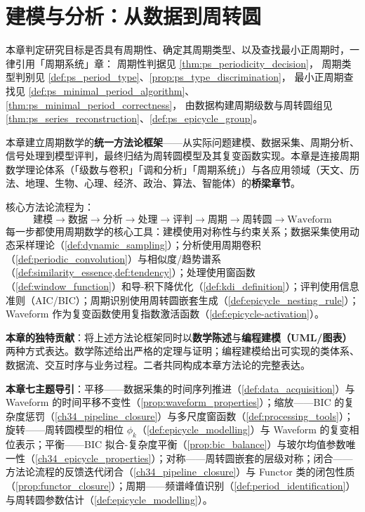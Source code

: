 \chapter{建模与分析：从数据到周转圆}
\label{chap:modelling-analysis}

\begin{remark}[本章目标的周期性判定（引用）]\label{rem:modelling_ps_hook}
本章判定研究目标是否具有周期性、确定其周期类型、以及查找最小正周期时，一律引用「周期系统」章：
周期性判据见 \cref{thm:ps_periodicity_decision}，
周期类型判别见 \cref{def:ps_period_type}、\cref{prop:ps_type_discrimination}，
最小正周期查找见 \cref{def:ps_minimal_period_algorithm}、\cref{thm:ps_minimal_period_correctness}，
由数据构建周期级数与周转圆组见 \cref{thm:ps_series_reconstruction}、\cref{def:ps_epicycle_group}。
\end{remark}

\begin{remark}\label{rem:modelling_analysis_positioning}
本章建立周期数学的\textbf{统一方法论框架}——从实际问题建模、数据采集、周期分析、信号处理到模型评判，最终归结为周转圆模型及其复变函数实现。本章是连接周期数学理论体系（「级数与卷积」「调和分析」「周期系统」）与各应用领域（天文、历法、地理、生物、心理、经济、政治、算法、智能体）的\textbf{桥梁章节}。

核心方法论流程为：
\[
\boxed{\text{建模}} \to \boxed{\text{数据}} \to \boxed{\text{分析}} \to \boxed{\text{处理}} \to \boxed{\text{评判}} \to \boxed{\text{周期}} \to \boxed{\text{周转圆}} \to \boxed{\text{Waveform}}
\]
每一步都使用周期数学的核心工具：建模使用对称性与约束关系；数据采集使用动态采样理论（\cref{def:dynamic_sampling}）；分析使用周期卷积（\cref{def:periodic_convolution}）与相似度/趋势谱系（\cref{def:similarity_essence,def:tendency}）；处理使用窗函数（\cref{def:window_function}）和导-积下降优化（\cref{def:kdi_definition}）；评判使用信息准则（AIC/BIC）；周期识别使用周转圆嵌套生成（\cref{def:epicycle_nesting_rule}）；Waveform 作为复变函数使用复指数激活函数（\cref{def:epicycle-activation}）。

\textbf{本章的独特贡献}：将上述方法论框架同时以\textbf{数学陈述}与\textbf{编程建模（UML/图表）}两种方式表达。数学陈述给出严格的定理与证明；编程建模给出可实现的类体系、数据流、交互时序与业务过程。二者共同构成本章方法论的完整表达。

\textbf{本章七主题导引}：平移——数据采集的时间序列推进（\cref{def:data_acquisition}）与 Waveform 的时间平移不变性（\cref{prop:waveform_properties}）；缩放——BIC 的复杂度惩罚（\cref{ch34_pipeline_closure}）与多尺度窗函数（\cref{def:processing_tools}）；旋转——周转圆模型的相位 $\phi_k$（\cref{def:epicycle_modelling}）与 Waveform 的复变相位表示；平衡——BIC 拟合-复杂度平衡（\cref{prop:bic_balance}）与玻尔均值参数唯一性（\cref{ch34_epicycle_properties}）；对称——周转圆嵌套的层级对称；闭合——方法论流程的反馈迭代闭合（\cref{ch34_pipeline_closure}）与 Functor 类的闭包性质（\cref{prop:functor_closure}）；周期——频谱峰值识别（\cref{def:period_identification}）与周转圆参数估计（\cref{def:epicycle_modelling}）。
\end{remark}

